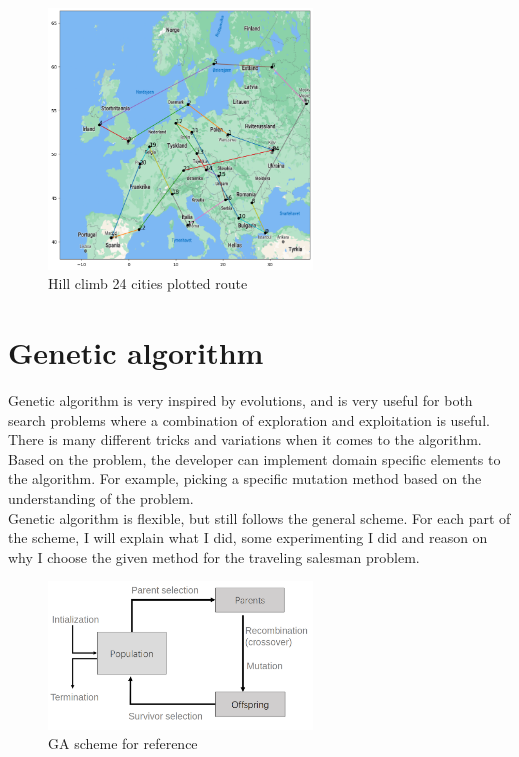 \documentclass{article}
\begin{document}
    \begin{figure}[ht]
        \includegraphics[width=7cm]{images/hill_climb_24_cities.png}
        \centering
        \caption{Hill climb 24 cities plotted route}
    \end{figure}

    \section{Genetic algorithm}

    Genetic algorithm is very inspired by evolutions, and is very useful for both search problems where a combination of exploration and exploitation is useful.
    There is many different tricks and variations when it comes to the algorithm. Based on the problem, the developer can implement domain specific elements to the algorithm. For example, picking a specific mutation method based on the understanding of the problem. \\
    
    Genetic algorithm is flexible, but still follows the general scheme. For each part of the scheme, I will explain what I did, some experimenting I did and reason on why I choose the given method for the traveling salesman problem.

    \begin{figure}[ht]
        \includegraphics[width=7cm]{images/ga_scheme.png}
        \centering
        \caption{GA scheme for reference}
    \end{figure}
\end{document}
